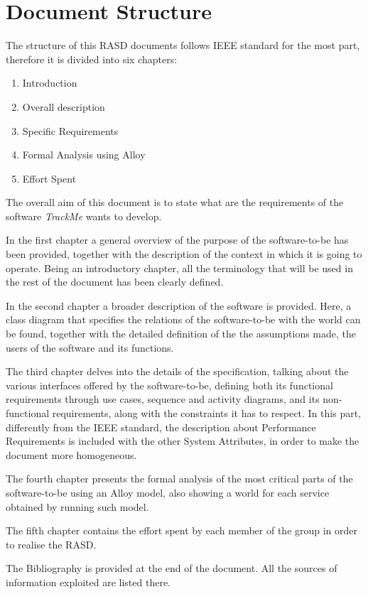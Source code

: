 \section{Document Structure}
    The structure of this RASD documents follows IEEE standard for the most part, therefore it is divided into six chapters:
    \begin{enumerate}
        \item Introduction
        
        \item Overall description
        
        \item Specific Requirements
        
        \item Formal Analysis using Alloy
        
        \item Effort Spent
    \end{enumerate}
    
The overall aim of this document is to state what are the requirements of the software \emph{TrackMe} wants to develop.
    
    In the first chapter a general overview of the purpose of the software-to-be has been provided, together with the description of the context in which it is going to operate. Being an introductory chapter, all the terminology that will be used in the rest of the document has been clearly defined.
    
    In the second chapter a broader description of the software is provided. Here, a class diagram that specifies the relations of the software-to-be with the world can be found, together with the detailed definition of the the assumptions made, the users of the software and its functions.
    
    The third chapter delves into the details of the specification, talking about the various interfaces offered by the software-to-be, defining both its functional requirements through use cases, sequence and activity diagrams, and its non-functional requirements, along with the constraints it has to respect. In this part, differently from the IEEE standard, the description about Performance Requirements is included with the other System Attributes, in order to make the document more homogeneous.
    
    The fourth chapter presents the formal analysis of the most critical parts of the software-to-be using an Alloy model, also showing a world for each service obtained by running such model.
    
    The fifth chapter contains the effort spent by each member of the group in order to realise the RASD.
    
    The Bibliography is provided at the end of the document. All the sources of information exploited are listed there.